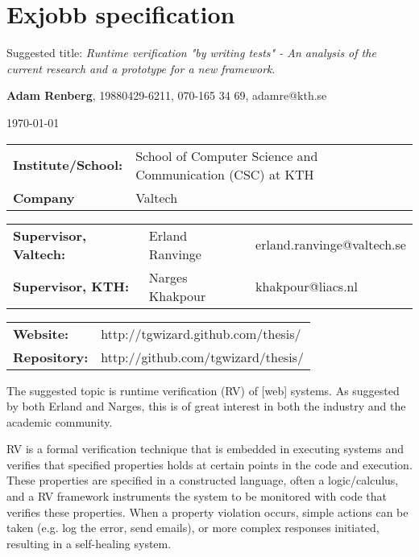 \documentclass[a4paper,11pt]{kth-mag}
\begin{document}
\removepagenumbers%
\setlength\parindent{0em}
\setlength\parskip{1em}

\pagestyle{empty}


\chapter*{Exjobb specification}

Suggested title: \textit{Runtime verification "by writing tests" - An analysis of the current research and a prototype for a new framework}.

\textbf{Adam Renberg}, 19880429-6211, 070-165 34 69, adamre@kth.se

\today

\begin{tabular}{lll}
	\textbf{Institute/School:} & School of Computer Science and Communication (CSC) at KTH \\
    \textbf{Company}           & Valtech \\
\end{tabular}

\begin{tabular}{lll}
	\textbf{Supervisor, Valtech:} & Erland Ranvinge & erland.ranvinge@valtech.se \\
    \textbf{Supervisor, KTH:}     & Narges Khakpour & khakpour@liacs.nl \\
\end{tabular}

\begin{tabular}{ll}
    \textbf{Website:} & http://tgwizard.github.com/thesis/ \\
    \textbf{Repository:} & http://github.com/tgwizard/thesis/ \\
\end{tabular}


The suggested topic is runtime verification (RV) of [web] systems. As suggested by both Erland and Narges, this is of great interest in both the industry and the academic community.

RV is a formal verification technique that is embedded in executing systems and verifies that specified properties holds at certain points in the code and execution. These properties are specified in a constructed language, often a logic/calculus, and a RV framework instruments the system to be monitored with code that verifies these properties. When a property violation occurs, simple actions can be taken (e.g. log the error, send emails), or more complex responses initiated, resulting in a self-healing system.
\end{document}
